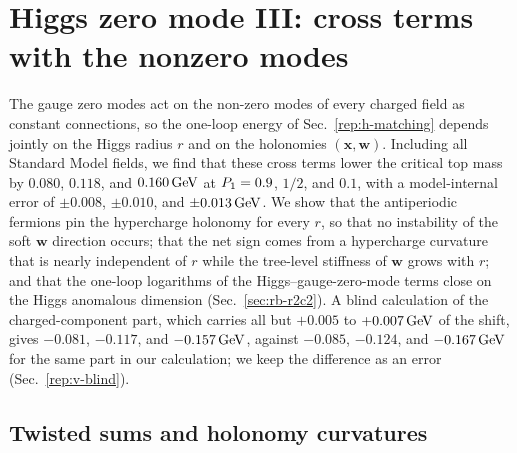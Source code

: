 \section{Higgs zero mode III: cross terms with the nonzero modes}\label{rep:h-cross}

The gauge zero modes act on the non-zero modes of every charged field as constant connections, so the one-loop energy of Sec.~\ref{rep:h-matching} depends jointly on the Higgs radius $r$ and on the holonomies $(\bm x,\bm w)$.
Including all Standard Model fields, we find that these cross terms lower the critical top mass by $0.080$, $0.118$, and $0.160\,\mathrm{GeV}$ at $P_1=0.9$, $1/2$, and $0.1$, with a model-internal error of $\pm0.008$, $\pm0.010$, and $\pm0.013\,\mathrm{GeV}$. %
We show that the antiperiodic fermions pin the hypercharge holonomy for every $r$, so that no instability of the soft $\bm w$ direction occurs; that the net sign comes from a hypercharge curvature that is nearly independent of $r$ while the tree-level stiffness of $\bm w$ grows with $r$; and that the one-loop logarithms of the Higgs--gauge-zero-mode terms close on the Higgs anomalous dimension (Sec.~\ref{sec:rb-r2c2}).
A blind calculation of the charged-component part, which carries all but $+0.005$ to $+0.007\,\mathrm{GeV}$ of the shift, gives $-0.081$, $-0.117$, and $-0.157\,\mathrm{GeV}$, against $-0.085$, $-0.124$, and $-0.167\,\mathrm{GeV}$ for the same part in our calculation; we keep the difference as an error (Sec.~\ref{rep:v-blind}). %

\subsection{Twisted sums and holonomy curvatures}
\label{sec:rb-twist}


